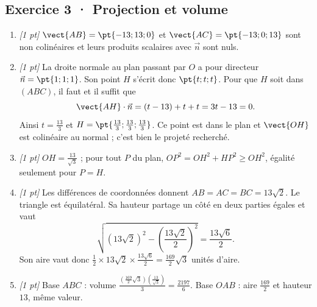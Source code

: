 \subsection*{Exercice 3 · Projection et volume}\begin{enumerate}

\item \textit{[1 pt]} $\vect{AB}=\pt{-13;13;0}$ et $\vect{AC}=\pt{-13;0;13}$ sont non colinéaires et leurs produits scalaires avec $\vec n$ sont nuls.

\item \textit{[1 pt]} La droite normale au plan passant par $O$ a pour directeur $\vec n=\pt{1;1;1}$. Son point $H$ s'écrit donc $\pt{t;t;t}$. Pour que $H$ soit dans $(ABC)$, il faut et il suffit que
\[\vect{AH}\cdot\vec n=(t-13)+t+t=3t-13=0.\]
Ainsi $t=\frac{13}{3}$ et $H=\pt{\frac{13}{3};\frac{13}{3};\frac{13}{3}}$. Ce point est dans le plan et $\vect{OH}$ est colinéaire au normal ; c'est bien le projeté recherché.

\item \textit{[1 pt]} $OH=\frac{13}{\sqrt{3}}$ ; pour tout $P$ du plan, $OP^2=OH^2+HP^2\ge OH^2$, égalité seulement pour $P=H$.

\item \textit{[1 pt]} Les différences de coordonnées donnent $AB=AC=BC=13\sqrt2$. Le triangle est équilatéral. Sa hauteur partage un côté en deux parties égales et vaut
\[\sqrt{(13\sqrt2)^2-(\frac{13\sqrt{2}}{2})^2}=\frac{13\sqrt6}{2}.\]
Son aire vaut donc $\frac12\times 13\sqrt2\times\frac{13\sqrt6}{2}=\frac{169}{2}\sqrt3$ unités d'aire.

\item \textit{[1 pt]} Base $ABC$ : volume $\frac{(\frac{169}{2}\sqrt3)(\frac{13}{\sqrt{3}})}{3}=\frac{2197}{6}$. Base $OAB$ : aire $\frac{169}{2}$ et hauteur $13$, même valeur.

\end{enumerate}

